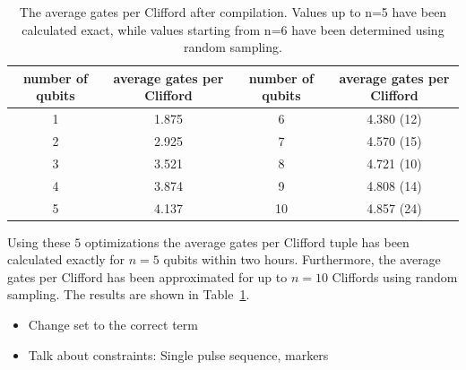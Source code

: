     \begin{table}
      \begin{tabular}{c c || c c}
        \toprule
        number of qubits  & average gates per Clifford & number of qubits  & average gates per Clifford \\
        \midrule
        1 & 1.875 & 6  & 4.380 (12)\\
        2 & 2.925 & 7  & 4.570 (15)\\
        3 & 3.521 & 8  & 4.721 (10)\\
        4 & 3.874 & 9  & 4.808 (14)\\
        5 & 4.137 & 10 & 4.857 (24)\\
        \bottomrule
      \end{tabular}
      \caption{The average gates per Clifford after compilation. Values up to n=5 have been calculated exact, while values starting from n=6 have been determined using random sampling.}
      \label{tab:gates per Clifford}
    \end{table}

    Using these $5$ optimizations the average gates per Clifford tuple has been calculated exactly for $n=5$ qubits within two hours. Furthermore, the average gates per Clifford has been approximated for up to $n=10$ Cliffords using random sampling. The results are shown in Table~\ref{tab:gates per Clifford}.

  \begin{itemize}
    \item Change set to the correct term
    \item Talk about constraints: Single pulse sequence, markers
  \end{itemize}